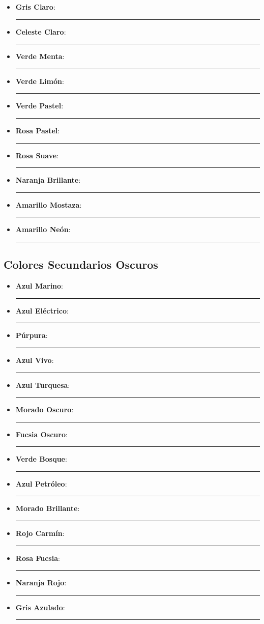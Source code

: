 \documentclass[twoside,12pt]{report}
\begin{document}
\begin{itemize}
    \item \textbf{Gris Claro}: \color[HTML]{99B3B3} \rule{6cm}{1cm}
    \item \textbf{Celeste Claro}: \color[HTML]{41B9E4} \rule{6cm}{1cm}
    \item \textbf{Verde Menta}: \color[HTML]{16C78E} \rule{6cm}{1cm}
    \item \textbf{Verde Limón}: \color[HTML]{8BB733} \rule{6cm}{1cm}
    \item \textbf{Verde Pastel}: \color[HTML]{ADD754} \rule{6cm}{1cm}
    \item \textbf{Rosa Pastel}: \color[HTML]{F56EB4} \rule{6cm}{1cm}
    \item \textbf{Rosa Suave}: \color[HTML]{FF9CD7} \rule{6cm}{1cm}
    \item \textbf{Naranja Brillante}: \color[HTML]{FF9929} \rule{6cm}{1cm}
    \item \textbf{Amarillo Mostaza}: \color[HTML]{F0AE19} \rule{6cm}{1cm}
    \item \textbf{Amarillo Neón}: \color[HTML]{FAD634} \rule{6cm}{1cm}
\end{itemize}

\subsection{Colores Secundarios Oscuros}

\begin{itemize}
    \item \textbf{Azul Marino}: \color[HTML]{004EA8} \rule{6cm}{1cm}
    \item \textbf{Azul Eléctrico}: \color[HTML]{2841DD} \rule{6cm}{1cm}
    \item \textbf{Púrpura}: \color[HTML]{7F32C8} \rule{6cm}{1cm}
    \item \textbf{Azul Vivo}: \color[HTML]{5064F7} \rule{6cm}{1cm}
    \item \textbf{Azul Turquesa}: \color[HTML]{0A7BC2} \rule{6cm}{1cm}
    \item \textbf{Morado Oscuro}: \color[HTML]{A31598} \rule{6cm}{1cm}
    \item \textbf{Fucsia Oscuro}: \color[HTML]{C822BC} \rule{6cm}{1cm}
    \item \textbf{Verde Bosque}: \color[HTML]{008768} \rule{6cm}{1cm}
    \item \textbf{Azul Petróleo}: \color[HTML]{0A819B} \rule{6cm}{1cm}
    \item \textbf{Morado Brillante}: \color[HTML]{9F42F5} \rule{6cm}{1cm}
    \item \textbf{Rojo Carmín}: \color[HTML]{C3094A} \rule{6cm}{1cm}
    \item \textbf{Rosa Fucsia}: \color[HTML]{E2284D} \rule{6cm}{1cm}
    \item \textbf{Naranja Rojo}: \color[HTML]{E23008} \rule{6cm}{1cm}
    \item \textbf{Gris Azulado}: \color[HTML]{667892} \rule{6cm}{1cm}
\end{itemize}


%
%

%
%
\end{document}
